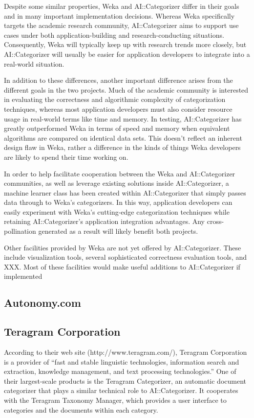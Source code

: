 \documentclass[a4paper]{report}
\begin{document}
Despite some similar properties, Weka and AI::Categorizer differ in
their goals and in many important implementation decisions.  Whereas
Weka specifically targets the academic research community,
AI::Categorizer aims to support use cases under both
application-building and research-conducting situations.
Consequently, Weka will typically keep up with research trends more
closely, but AI::Categorizer will usually be easier for application
developers to integrate into a real-world situation.

In addition to these differences, another important difference arises
from the different goals in the two projects.  Much of the academic
community is interested in evaluating the correctness and algorithmic
complexity of categorization techniques, whereas most application
developers must also consider resource usage in real-world terms like
time and memory.  In testing, AI::Categorizer has greatly outperformed
Weka in terms of speed and memory when equivalent algorithms are
compared on identical data sets.  This doesn't reflect an inherent
design flaw in Weka, rather a difference in the kinds of things Weka
developers are likely to spend their time working on.

In order to help facilitate cooperation between the Weka and
AI::Categorizer communities, as well as leverage existing solutions
inside AI::Categorizer, a machine learner class has been created
within AI::Categorizer that simply passes data through to Weka's
categorizers.  In this way, application developers can easily
experiment with Weka's cutting-edge categorization techniques while
retaining AI::Categorizer's application integration advantages.  Any
cross-pollination generated as a result will likely benefit both
projects.

Other facilities provided by Weka are not yet offered by
AI::Categorizer.  These include visualization tools, several
sophisticated correctness evaluation tools, and XXX.  Most of these
facilities would make useful additions to AI::Categorizer if
implemented

\subsection{Autonomy.com}

\subsection{Teragram Corporation}

According to their web site (http://www.teragram.com/), Teragram
Corporation is a provider of ``fast and stable linguistic
technologies, information search and extraction, knowledge management,
and text processing technologies.''  One of their largest-scale
products is the Teragram Categorizer, an automatic document
categorizer that plays a similar technical role to AI::Categorizer.
It cooperates with the Teragram Taxonomy Manager, which provides a
user interface to categories and the documents within each category.
\end{document}
